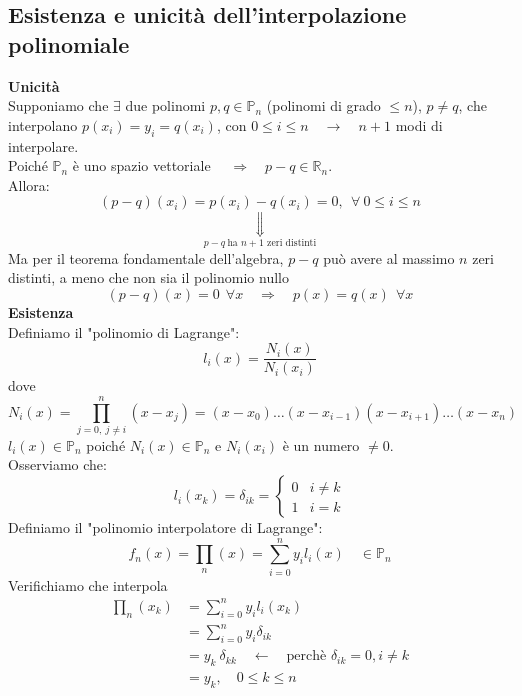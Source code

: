 \subsection{Esistenza e unicità dell'interpolazione polinomiale}
\textbf{Unicità}\\
Supponiamo che $\exists$ due polinomi $p,q \in \mathbb{P}_n$ (polinomi di grado $\le n$), $p\ne q$, che interpolano $p(x_i)=y_i=q(x_i)$, con $0\leq i \leq n \quad \rightarrow \quad n+1$ modi di interpolare.\\
Poiché $\mathbb{P}_n$ è uno spazio vettoriale $\quad \Rightarrow \quad p-q\in\mathbb{R}_n$.\\
Allora:
\[
(p-q)(x_i) = p(x_i) - q(x_i) = 0, \ \ \forall \ 0 \leq i \leq n
\]
\[
\underset{p-q \ \text{ha $n+1$ zeri distinti}}{\Downarrow}
\]
Ma per il teorema fondamentale dell'algebra, $p-q$ può avere al massimo $n$ zeri distinti, a meno che non sia il polinomio nullo
\[
(p-q)(x) = 0 \ \ \forall x \quad \Rightarrow \quad p(x) = q(x) \ \ \forall x
\]
\textbf{Esistenza}\\
Definiamo il "polinomio di Lagrange":
\[
l_i(x) = \frac{N_i(x)}{N_i(x_i)}
\]
dove
\[
N_i(x) = \prod_{j=0, \ j\neq i}^n (x-x_j) = (x-x_0) \dots (x-x_{i-1})(x-x_{i+1}) \dots (x-x_n)
\]
$l_i(x)\in\mathbb{P}_n$ poiché $N_i(x)\in\mathbb{P}_n$ e $N_i(x_i)$ è un numero $\ne0$.\\
Osserviamo che:
\[l_i(x_k) = \delta_{ik} =
\begin{cases}
0 & i\ne k \\
1 & i=k 
\end{cases}\]
Definiamo il "polinomio interpolatore di Lagrange":
\[ f_n(x) = \prod_n(x) = \sum_{i=0}^n y_i l_i(x) \quad \in\mathbb{P}_n\]
Verifichiamo che interpola
\[
\begin{split}
\prod _n (x_k) & = \sum_{i=0}^n y_i l_i (x_k) \\
& = \sum_{i=0}^n y_i \delta_{ik} \\
& = y_k \ \delta_{kk} \quad \longleftarrow \quad \text{perchè } \delta_{ik}=0, i \ne k\\
& = y_k, \quad 0 \leq k \leq n
\end{split}
\]